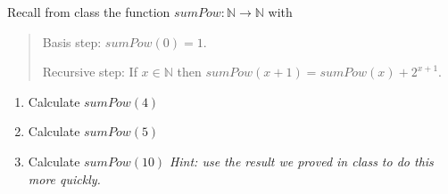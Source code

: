 
Recall from class the function $sumPow: \mathbb{N} \to \mathbb{N}$ with

\begin{quote}
Basis step: $sumPow(0) = 1$.

Recursive step: If $x \in \mathbb{N}$ then $sumPow(x+1) = sumPow(x) + 2^{x+1}$.
\end{quote}

\begin{enumerate}
\item Calculate $sumPow(4)$
\item Calculate $sumPow(5)$
\item Calculate $sumPow(10)$ {\it Hint: use the result we proved in class to do this more quickly.}
\end{enumerate}
